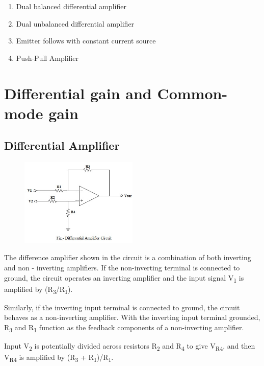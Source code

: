 \documentclass[11pt,a4paper,oneside]{article}
\begin{document}
\begin{enumerate}
	\item Dual  balanced  differential amplifier
	\item Dual  unbalanced  differential amplifier
	\item Emitter follows with constant current source
	\item Push-Pull Amplifier
\end{enumerate}

\clearpage

\section{Differential gain and Common-mode gain}

\subsection{Differential Amplifier\label{difamp}}

\begin{figure}[hbt!]
	\centering
	\includegraphics[width=0.5\textwidth]{images/Differential-amplifier-circuit.jpg}
	\label{Differential Amplifier circuit}
\end{figure}

The difference amplifier shown in the circuit is a combination of both inverting and non - inverting amplifiers. If the non-inverting terminal is connected to ground, the circuit operates an inverting amplifier and the input signal V\textsubscript{1} is amplified by (R\textsubscript{3}/R\textsubscript{1}).

Similarly, if the inverting input terminal is connected to ground, the circuit behaves as a non-inverting amplifier. With the inverting input terminal grounded, R\textsubscript{3} and R\textsubscript{1} function as the feedback components of a non-inverting amplifier.

Input V\textsubscript{2} is potentially divided across resistors R\textsubscript{2} and R\textsubscript{4} to give V\textsubscript{R4}, and then V\textsubscript{R4} is amplified by (R\textsubscript{3} + R\textsubscript{1})/R\textsubscript{1}.
\end{document}
